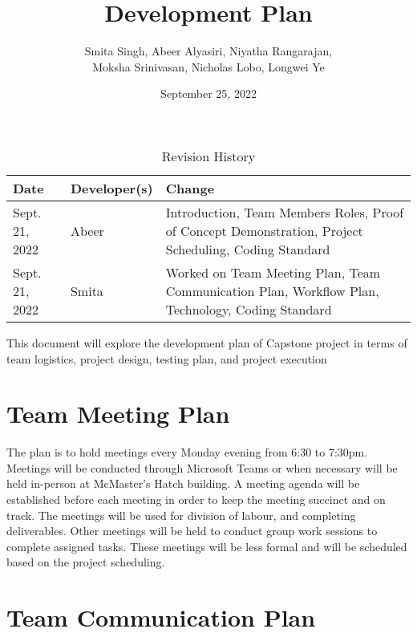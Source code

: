 \documentclass{article}
\date{September 25, 2022}
\begin{document}
\title{Development Plan\\\prognam}

\author{Smita Singh, Abeer Alyasiri, Niyatha Rangarajan,\\ Moksha Srinivasan, Nicholas Lobo, Longwei Ye}

\begin{table}[hp]
\caption{Revision History} \label{TblRevisionHistory}
\begin{tabularx}{\textwidth}{llX}
\toprule
\textbf{Date} & \textbf{Developer(s)} & \textbf{Change}\\
\midrule
Sept. 21, 2022 & Abeer & Introduction, Team Members Roles, Proof of Concept Demonstration, Project Scheduling, Coding Standard \\
Sept. 21, 2022 & Smita & Worked on Team Meeting Plan, Team Communication Plan, Workflow Plan, Technology, Coding Standard\\
\bottomrule
\end{tabularx}
\end{table}

\newpage

\maketitle

This document will explore the development plan of Capstone project in terms of team logistics, project design, testing plan, and project execution %

\section{Team Meeting Plan}
The plan is to hold meetings every Monday evening from 6:30 to 7:30pm. Meetings will be conducted through Microsoft Teams or when necessary will be held in-person at McMaster's Hatch building. A meeting agenda will be established before each meeting in order to keep the meeting succinct and on track. The meetings will be used for division of labour, and completing deliverables. %
Other meetings will be held to conduct group work sessions to complete assigned tasks. These meetings will be less formal and will be scheduled based on the project scheduling.

\section{Team Communication Plan}
\end{document}
